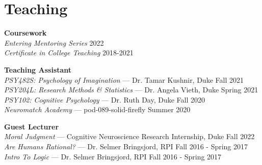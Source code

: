 \section{Teaching}
\textbf{Coursework} \\
\emph{Entering Mentoring Series} \hfill 2022 \\
\emph{Certificate in College Teaching} \hfill 2018-2021

\textbf{Teaching Assistant} \\
\emph{PSY482S: Psychology of Imagination} --- Dr. Tamar Kushnir, Duke \hfill Fall 2021 \\
\emph{PSY204L: Research Methods \& Statistics} --- Dr. Angela Vieth, Duke \hfill Spring 2021 \\
\emph{PSY102: Cognitive Psychology} --- Dr. Ruth Day, Duke  \hfill Fall 2020 \\
\emph{Neuromatch Academy} --- pod-089-solid-firefly \hfill Summer 2020

\textbf{Guest Lecturer} \\
\emph{Moral Judgment} --- Cognitive Neuroscience Research Internship, Duke \hfill Fall 2022 \\
\emph{Are Humans Rational?} --- Dr. Selmer Bringsjord, RPI \hfill Fall 2016 - Spring 2017 \\
\emph{Intro To Logic} --- Dr. Selmer Bringsjord, RPI \hfill Fall 2016 - Spring 2017
